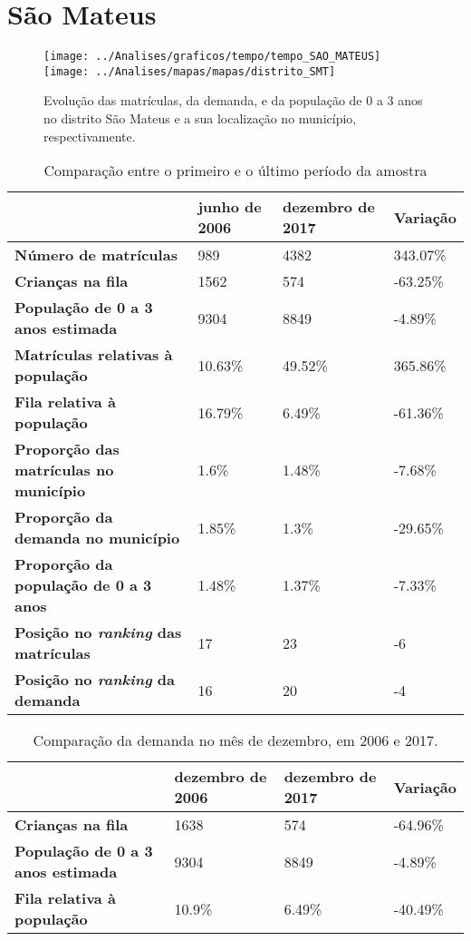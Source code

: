 \section{São Mateus}
\begin{figure}[H]
	\centering
	\texttt{[image: ../Analises/graficos/tempo/tempo\_SAO\_MATEUS]}
	\texttt{[image: ../Analises/mapas/mapas/distrito\_SMT]}
	\caption{Evolução das matrículas, da demanda, e da população de 0 a 3 anos no distrito São Mateus e a sua localização no município, respectivamente.}
\end{figure}
\begin{table}[H]
	\begin{tabular}{|l|l|l|l|}
		\hline
		\textbf{}                                      & \textbf{junho de 2006}       & \textbf{dezembro de 2017}    & \textbf{Variação} \\ \hline
		\textbf{Número de matrículas}                  & 989 & 4382 & 343.07\% \\ \hline
		\textbf{Crianças na fila}                      & 1562 & 574 & -63.25\% \\ \hline
		\textbf{População de 0 a 3 anos estimada}      & 9304 & 8849 & -4.89\% \\ \hline
		\textbf{Matrículas relativas à população}      & 10.63\% & 49.52\% & 365.86\% \\ \hline
		\textbf{Fila relativa à população}             & 16.79\% & 6.49\% & -61.36\% \\ \hline
		\textbf{Proporção das matrículas no município} & 1.6\% & 1.48\% & -7.68\% \\ \hline
		\textbf{Proporção da demanda no município}     & 1.85\% & 1.3\% & -29.65\% \\ \hline
		\textbf{Proporção da população de 0 a 3 anos}  & 1.48\% & 1.37\% & -7.33\% \\ \hline
		\textbf{Posição no \textit{ranking} das matrículas}     & 17 & 23 & -6 \\ \hline
		\textbf{Posição no \textit{ranking} da demanda}         & 16 & 20 & -4 \\ \hline
	\end{tabular}
	\caption{Comparação entre o primeiro e o último período da amostra}
\end{table}
\begin{table}[H]
	\begin{tabular}{|l|l|l|l|}
		\hline
		\textbf{}                                 & \textbf{dezembro de 2006} & \textbf{dezembro de 2017} & \textbf{Variação} \\ \hline
		\textbf{Crianças na fila}                      & 1638 & 574 & -64.96\% \\ \hline
		\textbf{População de 0 a 3 anos estimada}      & 9304 & 8849 & -4.89\% \\ \hline
		\textbf{Fila relativa à população}             & 10.9\% & 6.49\% & -40.49\% \\ \hline
	\end{tabular}
	\caption{Comparação da demanda no mês de dezembro, em 2006 e 2017.}
\end{table}
